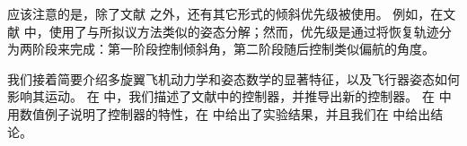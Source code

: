 应该注意的是，除了文献 \cite{brescianini2013nonlinear} 之外，还有其它形式的倾斜优先级被使用。 
例如，在文献 \cite{yu2015high} 中，使用了与所拟议方法类似的姿态分解；然而，优先级是通过将恢复轨迹分为两阶段来完成：第一阶段控制倾斜角，第二阶段随后控制类似偏航的角度。



%


我们接着简要介绍多旋翼飞机动力学和姿态数学的显著特征，以及飞行器姿态如何影响其运动。
在  中，我们描述了文献中的控制器，并推导出新的控制器。
在  中用数值例子说明了控制器的特性，在  中给出了实验结果，并且我们在  中给出结论。
